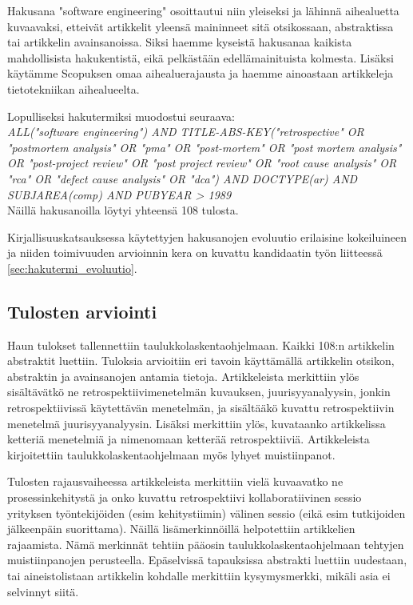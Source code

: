 Hakusana "software engineering" osoittautui niin yleiseksi ja lähinnä aihealuetta kuvaavaksi, etteivät artikkelit yleensä maininneet sitä otsikossaan, abstraktissa tai artikkelin avainsanoissa. Siksi haemme kyseistä hakusanaa kaikista mahdollisista hakukentistä, eikä pelkästään edellämainituista kolmesta. Lisäksi käytämme Scopuksen omaa aihealuerajausta ja haemme ainoastaan artikkeleja tietotekniikan aihealueelta.

Lopulliseksi hakutermiksi muodostui seuraava:\\
\textit{ALL("software engineering") AND TITLE-ABS-KEY("retrospective" OR "postmortem analysis" OR "pma" OR "post-mortem" OR "post mortem analysis" OR "post-project review" OR "post project review" OR "root cause analysis" OR "rca" OR "defect cause analysis" OR "dca") AND DOCTYPE(ar) AND SUBJAREA(comp) AND PUBYEAR > 1989}\\
Näillä hakusanoilla löytyi yhteensä 108 tulosta.

Kirjallisuuskatsauksessa käytettyjen hakusanojen evoluutio erilaisine kokeiluineen ja niiden toimivuuden arvioinnin kera on kuvattu kandidaatin työn liitteessä \ref{sec:hakutermi_evoluutio}.

\subsection{Tulosten arviointi}
Haun tulokset tallennettiin taulukkolaskentaohjelmaan. Kaikki 108:n artikkelin abstraktit luettiin. Tuloksia arvioitiin eri tavoin käyttämällä artikkelin otsikon, abstraktin ja avainsanojen antamia tietoja. Artikkeleista merkittiin ylös sisältävätkö ne retrospektiivimenetelmän kuvauksen, juurisyyanalyysin, jonkin retrospektiivissä käytettävän menetelmän, ja sisältääkö kuvattu retrospektiivin menetelmä juurisyyanalyysin. Lisäksi merkittiin ylös, kuvataanko artikkelissa ketteriä menetelmiä ja nimenomaan ketterää retrospektiiviä. Artikkeleista kirjoitettiin taulukkolaskentaohjelmaan myös lyhyet muistiinpanot.

Tulosten rajausvaiheessa artikkeleista merkittiin vielä kuvaavatko ne prosessinkehitystä ja onko kuvattu retrospektiivi kollaboratiivinen sessio yrityksen työntekijöiden (esim kehitystiimin) välinen sessio (eikä esim tutkijoiden jälkeenpäin suorittama). Näillä lisämerkinnöillä helpotettiin artikkelien rajaamista. Nämä merkinnät tehtiin pääosin taulukkolaskentaohjelmaan tehtyjen muistiinpanojen perusteella. Epäselvissä tapauksissa abstrakti luettiin uudestaan, tai  aineistolistaan artikkelin kohdalle merkittiin kysymysmerkki, mikäli asia ei selvinnyt siitä.

